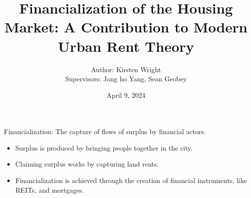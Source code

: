 \documentclass[hide notes=show/only]{beamer} %
\title{ Financialization of the Housing Market: A Contribution to Modern Urban Rent Theory}
\author{
  Author: Kirsten Wright \\
  Supervisors: Jang
  ho Yang, Sean Geobey
}
\institute{SYDE Graduate Seminar \\[1ex] University of Waterloo}
\date{April 9, 2024}
\begin{document}
{
    \maketitle   
}


\begin{frame}{Financialization:
The capture of flows of surplus by financial actors.}
\begin{itemize} \Large
    \item Surplus is produced by bringing people together in the city. 
    \item Claiming surplus works by capturing land rents. %
    \item Financialization is achieved through the creation of financial instruments, like REITs, and mortgages. 
\end{itemize}
\end{frame}

\begin{frame}
\begin{figure}[!ht]
\centering
\resizebox{0.85\textwidth}{!}{}
\label{fig:fieldsplus}
\end{figure}
\end{frame}
\end{document}
